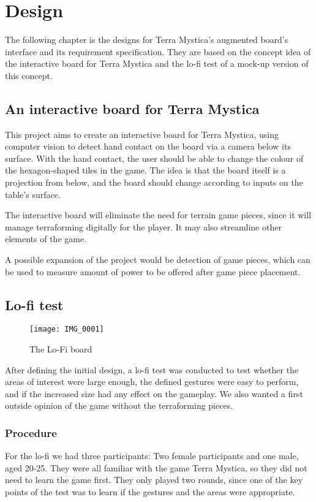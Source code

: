 \chapter{Design}\label{ch:design}
The following chapter is the designs for Terra Mystica's augmented board's interface and its requirement specification. They are based on the concept idea of the interactive board for Terra Mystica and the lo-fi test of a mock-up version of this concept.

\section{An interactive board for Terra Mystica}
This project aims to create an interactive board for Terra Mystica, using computer vision to detect hand contact on the board via a camera below its surface. With the hand contact, the user should be able to change the colour of the hexagon-shaped tiles in the game. The idea is that the board itself is a projection from below, and the board should change according to inputs on the table's surface.

The interactive board will eliminate the need for terrain game pieces, since it will manage terraforming digitally for the player. It may also streamline other elements of the game.

A possible expansion of the project would be detection of game pieces, which can be used to measure amount of power to be offered after game piece placement.

\section{Lo-fi test}
\begin{figure}
\centering
\texttt{[image: IMG\_0001]}
\caption{The Lo-Fi board}
\end{figure}

After defining the initial design, a lo-fi test was conducted to test whether the areas of interest were large enough, the defined gestures were easy to perform, and if the increased size had any effect on the gameplay. We also wanted a first outside opinion of the game without the terraforming pieces.

\subsection{Procedure}
For the lo-fi we had three participants: Two female participants and one male, aged 20-25. 
They were all familiar with the game Terra Mystica, so they did not need to learn the game first. They only played two rounds, since one of the key points of the test was to learn if the gestures and the areas were appropriate. 

